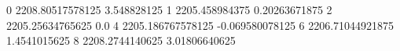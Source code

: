 0 2208.80517578125 3.548828125
1 2205.458984375 0.20263671875
2 2205.25634765625 0.0
4 2205.186767578125 -0.069580078125
6 2206.71044921875 1.4541015625
8 2208.2744140625 3.01806640625
